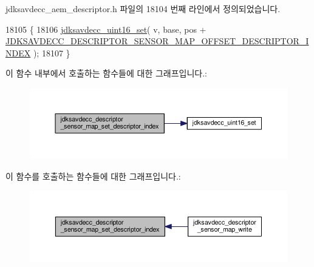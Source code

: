 jdksavdecc\+\_\+aem\+\_\+descriptor.\+h 파일의 18104 번째 라인에서 정의되었습니다.


\begin{DoxyCode}
18105 \{
18106     \hyperlink{group__endian_ga14b9eeadc05f94334096c127c955a60b}{jdksavdecc\_uint16\_set}( v, base, pos + 
      \hyperlink{group__descriptor__sensor__map_ga37f3a3f7faecf126d1471fbc82c970f2}{JDKSAVDECC\_DESCRIPTOR\_SENSOR\_MAP\_OFFSET\_DESCRIPTOR\_INDEX}
       );
18107 \}
\end{DoxyCode}


이 함수 내부에서 호출하는 함수들에 대한 그래프입니다.\+:
\nopagebreak
\begin{figure}[H]
\begin{center}
\leavevmode
\includegraphics[width=350pt]{group__descriptor__sensor__map_gaf17a3bc1ba205b94069539b5bb58d25d_cgraph}
\end{center}
\end{figure}




이 함수를 호출하는 함수들에 대한 그래프입니다.\+:
\nopagebreak
\begin{figure}[H]
\begin{center}
\leavevmode
\includegraphics[width=350pt]{group__descriptor__sensor__map_gaf17a3bc1ba205b94069539b5bb58d25d_icgraph}
\end{center}
\end{figure}


